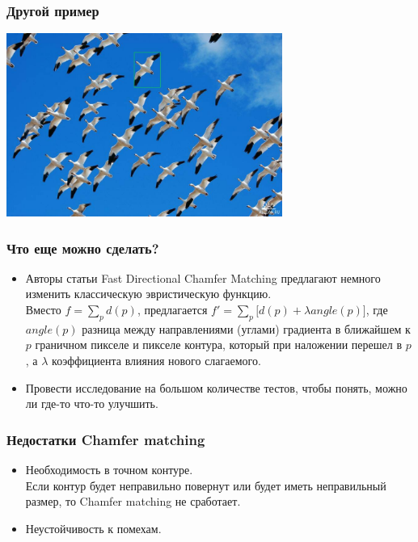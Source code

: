 \begin{frame}\frametitle{Другой пример}
    \begin{center}
        \includegraphics[height=6cm]{veselov_imgs/occurrence1.jpg}
    \end{center}
\end{frame}

\begin{frame}\frametitle{Что еще можно сделать?}
    \begin{itemize}
        \item Авторы статьи Fast Directional Chamfer Matching предлагают
        немного изменить классическую эвристическую функцию.\\
        Вместо $f = \sum\limits_{p}{d(p)}$, предлагается $f' = \sum\limits_{p}{\bigg[d(p) + \lambda angle(p)\bigg]}$,
        где $angle(p)$ разница между направлениями (углами) градиента в ближайшем к $p$ граничном пикселе
        и пикселе контура, который при наложении перешел в $p$, а $\lambda$ коэффициента влияния нового слагаемого.
        \pause
        \item Провести исследование на большом количестве тестов, чтобы понять, можно ли где-то что-то улучшить.
    \end{itemize}
\end{frame}

\begin{frame}\frametitle{Недостатки Chamfer matching}
    \begin{itemize}
        \item Необходимость в точном контуре.\\
        Если контур будет неправильно повернут или будет иметь
        неправильный размер, то Chamfer matching не сработает.
        \pause
        \item Неустойчивость к помехам.
    \end{itemize}
\end{frame}

